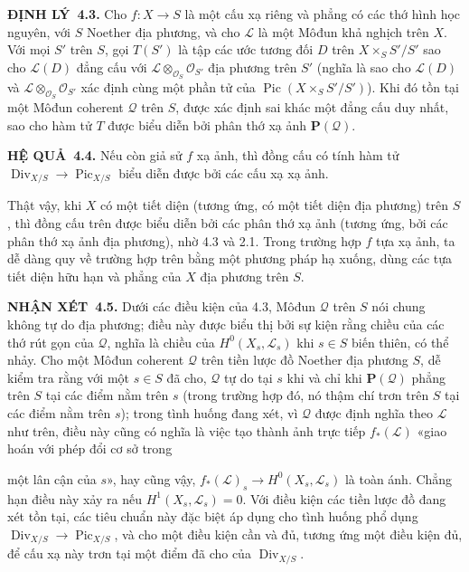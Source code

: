 \documentclass[11pt,twoside,openany]{book}
\numberwithin{equation}{section}
\newcommand{\src}[1]{%
  \phantomsection\hypertarget{src:\fgasourceid:#1}{}%
  \marginpar{\raggedleft\footnotesize\sffamily #1}%
}
\newcommand{\fgasourceid}{unset}
\newcommand{\result}[2]{\par\medskip\noindent\textbf{#1\if\relax\detokenize{#2}\relax\else\ #2\fi.}\quad}
\begin{document}
\result{ĐỊNH LÝ}{4.3} Cho $f:X\longrightarrow S$ là một cấu xạ riêng và phẳng
có các thớ hình học nguyên, với $S$ Noether địa phương, và cho $\mathcal L$ là
một Môđun khả nghịch trên $X$. Với mọi $S'$ trên $S$, gọi $T(S')$ là tập các
ước tương đối $D$ trên $X\times_SS'/S'$ sao cho $\mathcal L(D)$ đẳng cấu với
$\mathcal L\otimes_{\mathcal O_S}\mathcal O_{S'}$ địa phương trên $S'$ (nghĩa
là sao cho $\mathcal L(D)$ và
$\mathcal L\otimes_{\mathcal O_S}\mathcal O_{S'}$ xác định cùng một phần tử
của $\operatorname{Pic}(X\times_SS'/S')$). Khi đó tồn tại một Môđun coherent
$\mathcal Q$ trên $S$, được xác định sai khác một đẳng cấu duy nhất, sao cho
hàm tử $T$ được biểu diễn bởi phân thớ xạ ảnh $\mathbf P(\mathcal Q)$.

\result{HỆ QUẢ}{4.4} Nếu còn giả sử $f$ xạ ảnh, thì đồng cấu có tính hàm tử
$\operatorname{Div}_{X/S}\longrightarrow\operatorname{Pic}_{X/S}$ biểu diễn
được bởi các cấu xạ xạ ảnh.

Thật vậy, khi $X$ có một tiết diện (tương ứng, có một tiết diện địa phương)
trên $S$, thì đồng cấu trên được biểu diễn bởi các phân thớ xạ ảnh (tương ứng,
bởi các phân thớ xạ ảnh địa phương), nhờ 4.3 và 2.1. Trong trường hợp $f$ tựa
xạ ảnh, ta dễ dàng quy về trường hợp trên bằng một phương pháp hạ xuống, dùng
các tựa tiết diện hữu hạn và phẳng của $X$ địa phương trên $S$.

\result{NHẬN XÉT}{4.5} Dưới các điều kiện của 4.3, Môđun $\mathcal Q$ trên
$S$ nói chung không tự do địa phương; điều này được biểu thị bởi sự kiện rằng
chiều của các thớ rút gọn của $\mathcal Q$, nghĩa là chiều của
$H^0(X_s,\mathcal L_s)$ khi $s\in S$ biến thiên, có thể nhảy. Cho một Môđun
coherent $\mathcal Q$ trên tiền lược đồ Noether địa phương $S$, dễ kiểm tra
rằng với một $s\in S$ đã cho, $\mathcal Q$ tự do tại $s$ khi và chỉ khi
$\mathbf P(\mathcal Q)$ phẳng trên $S$ tại các điểm nằm trên $s$ (trong trường
hợp đó, nó thậm chí trơn trên $S$ tại các điểm nằm trên $s$); trong tình huống
đang xét, vì $\mathcal Q$ được định nghĩa theo $\mathcal L$ như trên, điều này
cũng có nghĩa là việc tạo thành ảnh trực tiếp $f_*(\mathcal L)$ «giao hoán với
phép đổi cơ sở trong
\src{154}
một lân cận của $s$», hay cũng vậy,
$f_*(\mathcal L)_s\longrightarrow H^0(X_s,\mathcal L_s)$ là toàn ánh. Chẳng
hạn điều này xảy ra nếu $H^1(X_s,\mathcal L_s)=0$. Với điều kiện các tiền lược
đồ đang xét tồn tại, các tiêu chuẩn này đặc biệt áp dụng cho tình huống phổ
dụng $\operatorname{Div}_{X/S}\longrightarrow\operatorname{Pic}_{X/S}$, và
cho một điều kiện cần và đủ, tương ứng một điều kiện đủ, để cấu xạ này trơn tại
một điểm đã cho của $\operatorname{Div}_{X/S}$.
\end{document}
